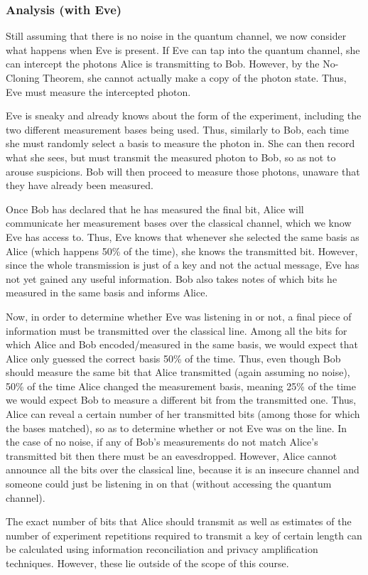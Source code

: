 \documentclass[11pt]{article} %
\begin{document}
\subsubsection{Analysis (with Eve)}
Still assuming that there is no noise in the quantum channel, we now consider what happens when Eve is present. If Eve can tap into the quantum channel, she can intercept the photons Alice is transmitting to Bob. However, by the No-Cloning Theorem, she cannot actually make a copy of the photon state. Thus, Eve must measure the intercepted photon. 

Eve is sneaky and already knows about the form of the experiment, including the two different measurement bases being used. Thus, similarly to Bob, each time she must randomly select a basis to measure the photon in. She can then record what she sees, but must transmit the measured photon to Bob, so as not to arouse suspicions. Bob will then proceed to measure those photons, unaware that they have already been measured. 

Once Bob has declared that he has measured the final bit, Alice will communicate her measurement bases over the classical channel, which we know Eve has access to. Thus, Eve knows that whenever she selected the same basis as Alice (which happens 50\% of the time), she knows the transmitted bit. However, since the whole transmission is just of a key and not the actual message, Eve has not yet gained any useful information. Bob also takes notes of which bits he measured in the same basis and informs Alice.

Now, in order to determine whether Eve was listening in or not, a final piece of information must be transmitted over the classical line. Among all the bits for which Alice and Bob encoded/measured in the same basis, we would expect that Alice only guessed the correct basis 50\% of the time. Thus, even though Bob should measure the same bit that Alice transmitted (again assuming no noise), 50\% of the time Alice changed the measurement basis, meaning 25\% of the time we would expect Bob to measure a different bit from the transmitted one. Thus, Alice can reveal a certain number of her transmitted bits (among those for which the bases matched), so as to determine whether or not Eve was on the line. In the case of no noise, if any of Bob's measurements do not match Alice's transmitted bit then there must be an eavesdropped. However, Alice cannot announce all the bits over the classical line, because it is an insecure channel and someone could just be listening in on that (without accessing the quantum channel).

The exact number of bits that Alice should transmit as well as estimates of the number of experiment repetitions required to transmit a key of certain length can be calculated using information reconciliation and privacy amplification techniques. However, these lie outside of the scope of this course. 
\end{document}
